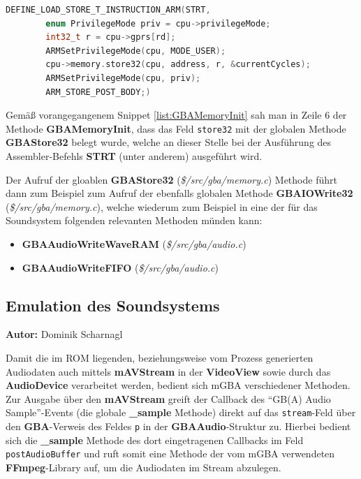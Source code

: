 \documentclass[11pt,a4paper]{scrartcl}
\newcommand{\AutorDominik} {
    \vspace{-4mm}
    \large \textbf{Autor:} Dominik Scharnagl \normalsize
    \vspace{2mm}
}
\begin{document}
\vspace{5mm}
\begin{lstlisting}[language=C++, caption={ARM Instruction Makro f\"ur \textbf{STRT}}, label={list:ARMInstruction_STRT}]
    DEFINE_LOAD_STORE_T_INSTRUCTION_ARM(STRT,
	    enum PrivilegeMode priv = cpu->privilegeMode;
	    int32_t r = cpu->gprs[rd];
	    ARMSetPrivilegeMode(cpu, MODE_USER);
	    cpu->memory.store32(cpu, address, r, &currentCycles);
	    ARMSetPrivilegeMode(cpu, priv);
	    ARM_STORE_POST_BODY;)
\end{lstlisting}

Gem\"a{\ss} vorangegangenem Snippet \ref{list:GBAMemoryInit} sah man in Zeile 6 der Methode \textbf{GBAMemoryInit}, dass das Feld \verb|store32| mit der globalen Methode \textbf{GBAStore32} belegt wurde, welche an dieser Stelle bei der Ausf\"uhrung des Assembler-Befehls \textbf{STRT} (unter anderem) ausgef\"uhrt wird.

Der Aufruf der gloablen \textbf{GBAStore32} (\textit{\$/src/gba/memory.c}) Methode f\"uhrt dann zum Beispiel zum Aufruf der ebenfalls globalen Methode \textbf{GBAIOWrite32} (\textit{\$/src/gba/memory.c}), welche wiederum zum Beispiel in eine der f\"ur das Soundsystem folgenden relevanten Methoden m\"unden kann:

\begin{itemize}
    \item \textbf{GBAAudioWriteWaveRAM} (\textit{\$/src/gba/audio.c})
    \item \textbf{GBAAudioWriteFIFO} (\textit{\$/src/gba/audio.c})
\end{itemize}



\subsection{Emulation des Soundsystems} \label{EmulationSoundsystem}
\AutorDominik

Damit die im ROM liegenden, beziehungsweise vom Prozess generierten Audiodaten auch mittels \textbf{mAVStream} in der \textbf{VideoView} sowie durch das \textbf{AudioDevice} verarbeitet werden, bedient sich mGBA verschiedener Methoden. Zur Ausgabe \"uber den \textbf{mAVStream} greift der Callback des \enquote{GB(A) Audio Sample}-Events (die globale \textbf{{\_}sample} Methode) direkt auf das \verb|stream|-Feld \"uber den \textbf{GBA}-Verweis des Feldes \verb|p| in der \textbf{GBAAudio}-Struktur zu. Hierbei bedient sich die \textbf{{\_}sample} Methode des dort eingetragenen Callbacks im Feld \verb|postAudioBuffer| und ruft somit eine Methode der vom mGBA verwendeten \textbf{FFmpeg}-Library auf, um die Audiodaten im Stream abzulegen.
\end{document}
